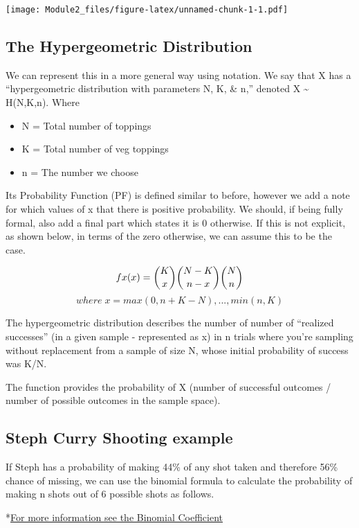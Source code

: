\documentclass[]{book}
\providecommand{\tightlist}{%
  \setlength{\itemsep}{0pt}\setlength{\parskip}{0pt}}
\theoremstyle{definition}
\theoremstyle{definition}
\theoremstyle{definition}
\theoremstyle{remark}
\begin{document}
\texttt{[image: Module2\_files/figure-latex/unnamed-chunk-1-1.pdf]}

\subsection{The Hypergeometric
Distribution}\label{the-hypergeometric-distribution}

We can represent this in a more general way using notation. We say that
X has a ``hypergeometric distribution with parameters N, K, \& n,''
denoted X \textasciitilde{} H(N,K,n). Where

\begin{itemize}
\tightlist
\item
  N = Total number of toppings
\item
  K = Total number of veg toppings
\item
  n = The number we choose
\end{itemize}

Its Probability Function (PF) is defined similar to before, however we
add a note for which values of x that there is positive probability. We
should, if being fully formal, also add a final part which states it is
0 otherwise. If this is not explicit, as shown below, in terms of the
zero otherwise, we can assume this to be the case.

\[fx(x)=  \binom{K}{x} \binom{N-K}{n - x} \\\binom{N}{n}\]
\[ where \; x = max(0, n + K-N),...,min(n,K) \]

The hypergeometric distribution describes the number of number of
``realized successes'' (in a given sample - represented as x) in n
trials where you're sampling without replacement from a sample of size
N, whose initial probability of success was K/N.

The function provides the probability of X (number of successful
outcomes / number of possible outcomes in the sample space).

\subsection{Steph Curry Shooting
example}\label{steph-curry-shooting-example}

If Steph has a probability of making 44\% of any shot taken and
therefore 56\% chance of missing, we can use the binomial formula to
calculate the probability of making n shots out of 6 possible shots as
follows.

*\href{https://en.wikipedia.org/wiki/Binomial_coefficient}{For more
information see the Binomial Coefficient}
\end{document}
